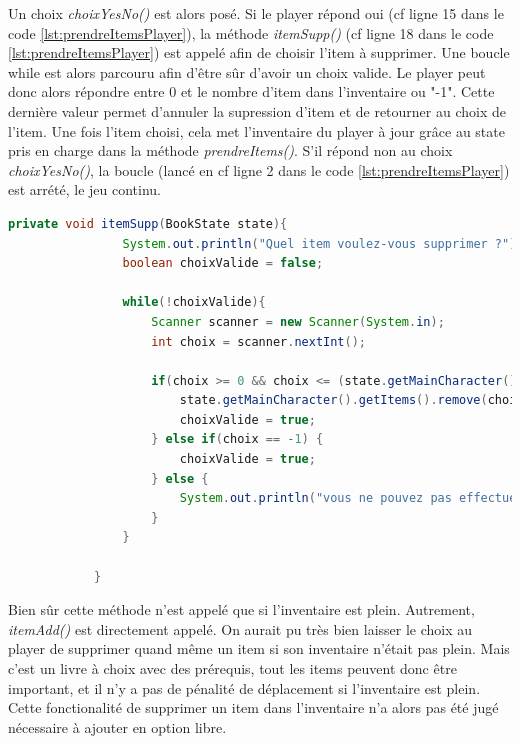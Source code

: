 		Un choix \textit{choixYesNo()} est alors posé. Si le player répond oui (cf ligne 15 dans le code \ref{lst:prendreItemsPlayer}), la méthode \textit{itemSupp()} (cf ligne 18 dans le code \ref{lst:prendreItemsPlayer}) est appelé afin de choisir l'item à supprimer. Une boucle while est alors parcouru afin d'être sûr d'avoir un choix valide. Le player peut donc alors répondre entre 0 et le nombre d'item dans l'inventaire ou "-1". Cette dernière valeur permet d'annuler la supression d'item et de retourner au choix de l'item. Une fois l'item choisi, cela met l'inventaire du player à jour grâce au state pris en charge dans la méthode \textit{prendreItems()}. S'il répond non au choix \textit{choixYesNo()}, la boucle (lancé en cf ligne 2 dans le code \ref{lst:prendreItemsPlayer}) est arrété, le jeu continu.

		\begin{lstlisting}[gobble=12, language=java, caption=itemSupp()]
			private void itemSupp(BookState state){
				System.out.println("Quel item voulez-vous supprimer ?");
				boolean choixValide = false;

				while(!choixValide){
					Scanner scanner = new Scanner(System.in);
					int choix = scanner.nextInt();

					if(choix >= 0 && choix <= (state.getMainCharacter().getItems().size()-1)){
						state.getMainCharacter().getItems().remove(choix);
						choixValide = true;
					} else if(choix == -1) {
						choixValide = true;
					} else {
						System.out.println("vous ne pouvez pas effectuer ce choix");
					}
				}

			}
		\end{lstlisting}

		Bien sûr cette méthode n'est appelé que si l'inventaire est plein. Autrement, \textit{itemAdd()} est directement appelé. On aurait pu très bien laisser le choix au player de supprimer quand même un item si son inventaire n'était pas plein. Mais c'est un livre à choix avec des prérequis, tout les items peuvent donc être important, et il n'y a pas de pénalité de déplacement si l'inventaire est plein. Cette fonctionalité de supprimer un item dans l'inventaire n'a alors pas été jugé nécessaire à ajouter en option libre.

